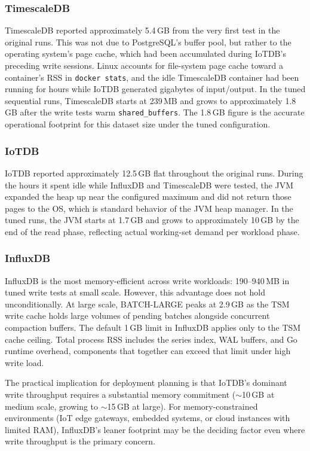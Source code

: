 \subsubsection{TimescaleDB}

TimescaleDB reported approximately 5.4\,GB from the very first test in the
original runs. This was not due to PostgreSQL's buffer pool, but rather to the operating system's page cache, which had been accumulated during IoTDB's preceding write sessions. Linux accounts for file-system page cache
toward a container's RSS in \texttt{docker stats}, and the idle TimescaleDB container
had been running for hours while IoTDB generated gigabytes of input/output. In the tuned
sequential runs, TimescaleDB starts at 239\,MB and grows to approximately 1.8\,GB
after the write tests warm \texttt{shared\_buffers}. The 1.8\,GB figure is the
accurate operational footprint for this dataset size under the tuned configuration.

\subsubsection{IoTDB}

IoTDB reported approximately 12.5\,GB flat throughout the original runs.
During the hours it spent idle while InfluxDB and TimescaleDB were tested, the JVM
expanded the heap up near the configured maximum and did not return those pages to the OS,
which is standard behavior of the JVM heap manager. In the tuned runs, the JVM starts
at 1.7\,GB and grows to approximately
10\,GB by the end of the read phase, reflecting actual working-set demand per workload
phase.

\subsubsection{InfluxDB}

InfluxDB is the most memory-efficient across write workloads: 190--940\,MB in
tuned write tests at small scale. However, this advantage does not hold unconditionally.
At large scale, BATCH-LARGE peaks at 2.9\,GB as the TSM write cache holds large volumes
of pending batches alongside concurrent compaction buffers. The default 1\,GB limit in InfluxDB applies only to the TSM cache ceiling. Total process RSS includes the series index, WAL buffers, and Go runtime overhead, components that together can exceed that limit under high write load.

The practical implication for deployment planning is that IoTDB's dominant write throughput
requires a substantial memory commitment ($\sim$10\,GB at medium scale, growing to $\sim$15\,GB
at large). For memory-constrained environments (IoT edge gateways, embedded systems,
or cloud instances with limited RAM), InfluxDB's leaner footprint may be the deciding
factor even where write throughput is the primary concern.

